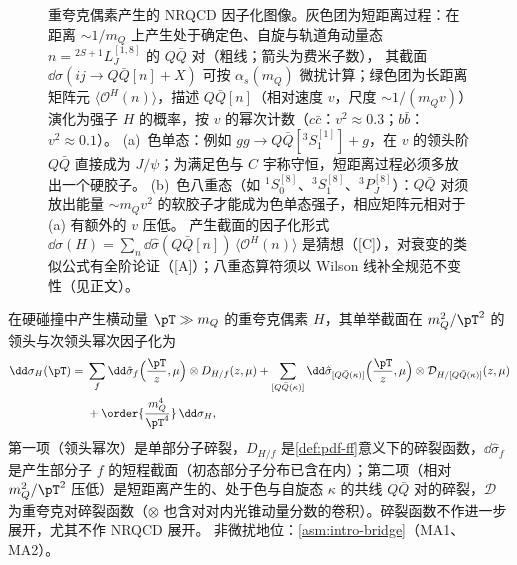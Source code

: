 \begin{figure}[htbp]
\caption{重夸克偶素产生的 NRQCD 因子化图像。灰色团为短距离过程：在距离 $\sim1/m_Q$ 上产生处于确定色、自旋与轨道角动量态 $n={}^{2S+1}L_J^{[1,8]}$ 的 $Q\bar Q$ 对（粗线；箭头为费米子数），
其截面 $\dd\hat\sigma(ij\to Q\bar Q[n]+X)$ 可按 $\alpha_s(m_Q)$ 微扰计算；绿色团为长距离矩阵元 $\langle\mathcal O^{H}(n)\rangle$，描述 $Q\bar Q[n]$（相对速度 $v$，尺度 $\sim1/(m_Qv)$）演化为强子 $H$ 的概率，按 $v$ 的幂次计数（$c\bar c$：$v^2\approx0.3$；$b\bar b$：$v^2\approx0.1$）。
(a)~色单态：例如 $gg\to Q\bar Q[{}^3S_1^{[1]}]+g$，在 $v$ 的领头阶 $Q\bar Q$ 直接成为 $J/\psi$；为满足色与 $C$ 宇称守恒，短距离过程必须多放出一个硬胶子。
(b)~色八重态（如 ${}^1S_0^{[8]}$、${}^3S_1^{[8]}$、${}^3P_J^{[8]}$）：$Q\bar Q$ 对须放出能量 $\sim m_Qv^2$ 的软胶子才能成为色单态强子，相应矩阵元相对于 (a) 有额外的 $v$ 压低。
产生截面的因子化形式 $\dd\sigma(H)=\sum_n\dd\hat\sigma(Q\bar Q[n])\,\langle\mathcal O^H(n)\rangle$ 是猜想（[C]），对衰变的类似公式有全阶论证（[A]）；八重态算符须以 Wilson 线补全规范不变性（见正文）。}
\label{fig:nrqcd}
\end{figure}
\begin{proposition}\label{prop:heavy-quarkonium-fragmentation}
在硬碰撞中产生横动量 $\pT\gg m_Q$ 的重夸克偶素 $H$，其单举截面在 $m_Q^2/\pT^2$ 的领头与次领头幂次因子化为
\begin{equation}\label{eq:heavy-frag}
\begin{split}
\dd\sigma_{H}(\pT)={}&\sum_f\dd\hat\sigma_{f}\Big(\frac{\pT}{z},\mu\Big)\otimes D_{H/f}(z,\mu)
+\sum_{[Q\bar Q(\kappa)]}\dd\hat\sigma_{[Q\bar Q(\kappa)]}\Big(\frac{\pT}{z},\mu\Big)\otimes\mathcal D_{H/[Q\bar Q(\kappa)]}(z,\mu)\\
&+\order{\frac{m_Q^4}{\pT^4}}\,\dd\sigma_H ,
\end{split}
\end{equation}
第一项（领头幂次）是单部分子碎裂，$D_{H/f}$ 是\cref{def:pdf-ff}意义下的碎裂函数，$\dd\hat\sigma_f$ 是产生部分子 $f$ 的短程截面（初态部分子分布已含在内）；第二项（相对 $m_Q^2/\pT^2$ 压低）是短距离产生的、处于色与自旋态 $\kappa$ 的共线 $Q\bar Q$ 对的碎裂，$\mathcal D$ 为重夸克对碎裂函数（$\otimes$ 也含对对内光锥动量分数的卷积）。碎裂函数不作进一步展开，尤其不作 NRQCD 展开。
非微扰地位：\cref{asm:intro-bridge}（MA1、MA2）。
\end{proposition}

